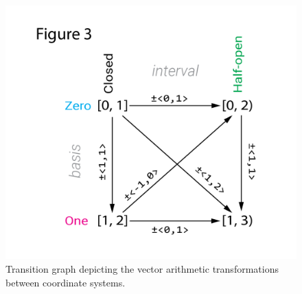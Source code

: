 \documentclass[12pt]{article}
\begin{document}
\begin{figure}[h]
\includegraphics[width=\columnwidth]{transitiongraph.png}
\caption{Transition graph depicting the vector arithmetic transformations between coordinate systems.}
\label{fig:transitiongraph}
\end{figure}
\end{document}
